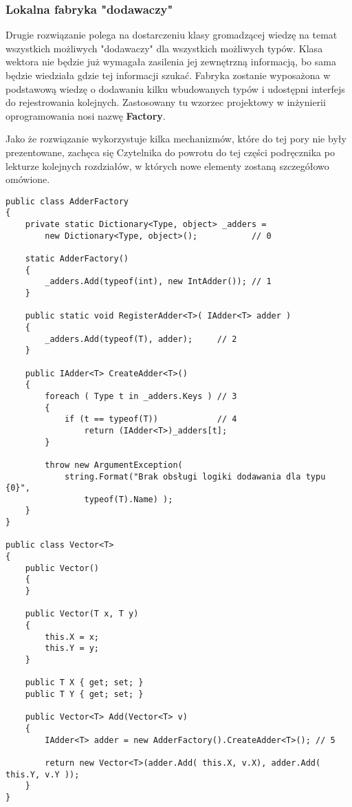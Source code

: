 \subsubsection{Lokalna fabryka "dodawaczy"}

Drugie rozwiązanie polega na dostarczeniu klasy gromadzącej wiedzę na temat wszystkich możliwych "dodawaczy"
dla wszystkich możliwych typów. Klasa wektora nie będzie już wymagała zasilenia jej zewnętrzną informacją, bo
sama będzie wiedziała gdzie tej informacji szukać. Fabryka zostanie wyposażona w podstawową wiedzę o
dodawaniu kilku wbudowanych typów i udostępni interfejs do rejestrowania kolejnych. Zastosowany tu wzorzec projektowy
w inżynierii oprogramowania nosi nazwę {\bf Factory}.

Jako że rozwiązanie wykorzystuje kilka mechanizmów, które do tej pory nie były prezentowane, zachęca się Czytelnika do
powrotu do tej części podręcznika po lekturze kolejnych rozdziałów, w których nowe elementy zostaną szczegółowo
omówione.

\begin{scriptsize}
\begin{verbatim}
public class AdderFactory
{
    private static Dictionary<Type, object> _adders = 
        new Dictionary<Type, object>();           // 0

    static AdderFactory()
    {
        _adders.Add(typeof(int), new IntAdder()); // 1
    }

    public static void RegisterAdder<T>( IAdder<T> adder )
    {
        _adders.Add(typeof(T), adder);     // 2
    }

    public IAdder<T> CreateAdder<T>()
    {
        foreach ( Type t in _adders.Keys ) // 3
        {
            if (t == typeof(T))            // 4
                return (IAdder<T>)_adders[t];
        }

        throw new ArgumentException(
            string.Format("Brak obsługi logiki dodawania dla typu {0}",
                typeof(T).Name) );
    }
}

public class Vector<T>
{
    public Vector()
    {
    }

    public Vector(T x, T y)
    {
        this.X = x;
        this.Y = y;
    }

    public T X { get; set; }
    public T Y { get; set; }

    public Vector<T> Add(Vector<T> v)
    {
        IAdder<T> adder = new AdderFactory().CreateAdder<T>(); // 5

        return new Vector<T>(adder.Add( this.X, v.X), adder.Add( this.Y, v.Y ));
    }
}
\end{verbatim}
\end{scriptsize}


